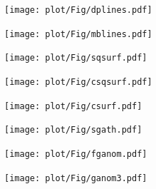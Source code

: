 \begin{frame}
  \begin{figure}
  \texttt{[image: plot/Fig/dplines.pdf]}
  \end{figure}
\end{frame}

\begin{frame}
  \begin{figure}
  \texttt{[image: plot/Fig/mblines.pdf]}
  \end{figure}
\end{frame}

\begin{frame}
  \begin{figure}
  \texttt{[image: plot/Fig/sqsurf.pdf]}
  \end{figure}
\end{frame}

\begin{frame}
  \begin{figure}
  \texttt{[image: plot/Fig/csqsurf.pdf]}
  \end{figure}
\end{frame}

\begin{frame}
  \begin{figure}
  \texttt{[image: plot/Fig/csurf.pdf]}
  \end{figure}
\end{frame}

\begin{frame}
  \begin{figure}
  \texttt{[image: plot/Fig/sgath.pdf]}
  \end{figure}
\end{frame}

\begin{frame}
  \begin{figure}
  \texttt{[image: plot/Fig/fganom.pdf]}
  \end{figure}
\end{frame}

\begin{frame}
  \begin{figure}
  \texttt{[image: plot/Fig/ganom3.pdf]}
  \end{figure}
\end{frame}

